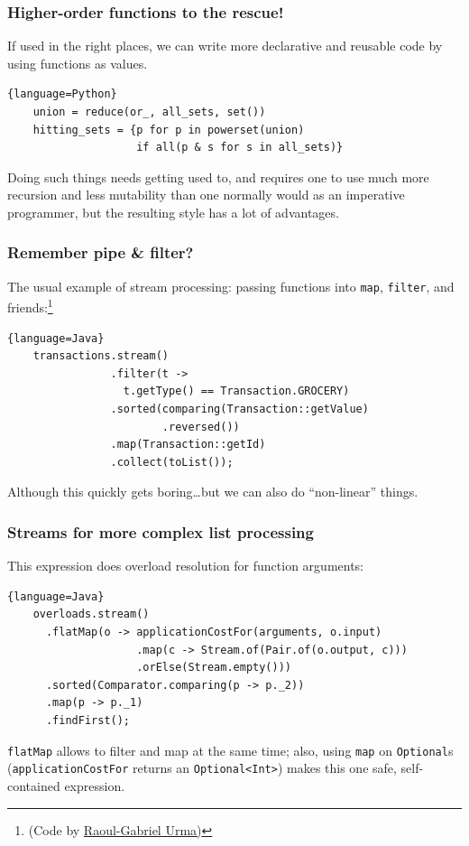 \documentclass{beamer}
\begin{document}
\begin{frame}[containsverbatim]
  \frametitle{Higher-order functions to the rescue!} 

  If used in the right places, we can write more declarative and reusable code by using functions as
  values.

  \begin{lstlisting}{language=Python}
    union = reduce(or_, all_sets, set())
    hitting_sets = {p for p in powerset(union) 
                    if all(p & s for s in all_sets)}
  \end{lstlisting}

  Doing such things needs getting used to, and requires one to use much more recursion and less
  mutability than one normally would as an imperative programmer, but the resulting style has a lot
  of advantages.
\end{frame}


\begin{frame}[containsverbatim]
  \frametitle{Remember pipe \& filter?} 

  The usual example of stream processing: passing functions into \lstinline|map|,
  \lstinline|filter|, and friends:\footnote{(Code by
    \href{http://www.oracle.com/technetwork/articles/java/ma14-java-se-8-streams-2177646.html}{%
      Raoul-Gabriel Urma)}}

  \begin{lstlisting}{language=Java}
    transactions.stream()
                .filter(t -> 
                  t.getType() == Transaction.GROCERY)
                .sorted(comparing(Transaction::getValue)
                        .reversed())
                .map(Transaction::getId)
                .collect(toList());
  \end{lstlisting}

  Although this quickly gets boring\ldots but we can also do \enquote{non-linear} things.
\end{frame}

\begin{frame}[containsverbatim]
  \frametitle{Streams for more complex list processing} 

  This expression does overload resolution for function arguments:

  \begin{lstlisting}{language=Java}
    overloads.stream()
      .flatMap(o -> applicationCostFor(arguments, o.input)
                    .map(c -> Stream.of(Pair.of(o.output, c)))
                    .orElse(Stream.empty()))
      .sorted(Comparator.comparing(p -> p._2))
      .map(p -> p._1)
      .findFirst();
  \end{lstlisting}

  \lstinline|flatMap| allows to filter and map at the same time; also, using \lstinline|map| on 
  \lstinline|Optional|s (\lstinline|applicationCostFor| returns an \lstinline|Optional<Int>|) makes
  this one safe, self-contained expression.
\end{frame}
\end{document}
